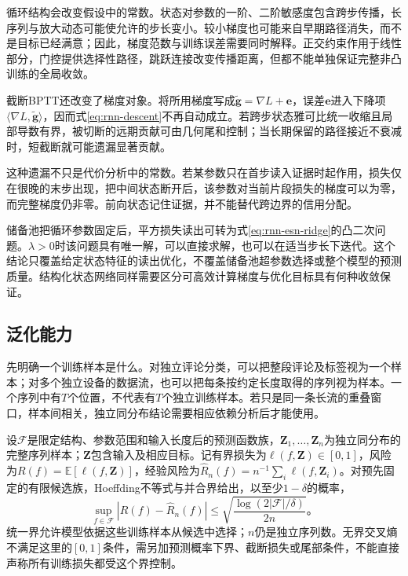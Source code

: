 循环结构会改变假设中的常数。状态对参数的一阶、二阶敏感度包含跨步传播，长序列与放大动态可能使允许的步长变小。较小梯度也可能来自早期路径消失，而不是目标已经满意；因此，梯度范数与训练误差需要同时解释。正交约束作用于线性部分，门控提供选择性路径，跳跃连接改变传播距离，但都不能单独保证完整非凸训练的全局收敛。

截断BPTT还改变了梯度对象。将所用梯度写成$\widetilde{\bm{g}}=\nabla L+\bm{e}$，误差$\bm{e}$进入下降项$\langle\nabla L,\widetilde{\bm{g}}\rangle$，因而式\eqref{eq:rnn-descent}不再自动成立。若跨步状态雅可比统一收缩且局部导数有界，被切断的远期贡献可由几何尾和控制；当长期保留的路径接近不衰减时，短截断就可能遗漏显著贡献。

这种遗漏不只是代价分析中的常数。若某参数只在首步读入证据时起作用，损失仅在很晚的末步出现，把中间状态断开后，该参数对当前片段损失的梯度可以为零，而完整梯度仍非零。前向状态记住证据，并不能替代跨边界的信用分配。

储备池把循环参数固定后，平方损失读出可转为式\eqref{eq:rnn-esn-ridge}的凸二次问题。$\lambda>0$时该问题具有唯一解，可以直接求解，也可以在适当步长下迭代。这个结论只覆盖给定状态特征的读出优化，不覆盖储备池超参数选择或整个模型的预测质量。结构化状态网络同样需要区分可高效计算梯度与优化目标具有何种收敛保证。

\subsection{泛化能力}
\label{sec:rnn-generalization}

先明确一个训练样本是什么。对独立评论分类，可以把整段评论及标签视为一个样本；对多个独立设备的数据流，也可以把每条按约定长度取得的序列视为样本。一个序列中有$T$个位置，不代表有$T$个独立训练样本。若只是同一条长流的重叠窗口，样本间相关，独立同分布结论需要相应依赖分析后才能使用。

设$\mathcal{F}$是限定结构、参数范围和输入长度后的预测函数族，$\bm{Z}_1,\ldots,\bm{Z}_n$为独立同分布的完整序列样本；$\bm{Z}$包含输入及相应目标。记有界损失为$\ell(f,\bm{Z})\in[0,1]$，风险为$R(f)=\mathbb{E}[\ell(f,\bm{Z})]$，经验风险为$\widehat R_n(f)=n^{-1}\sum_i\ell(f,\bm{Z}_i)$。对预先固定的有限候选族，Hoeffding不等式与并合界给出，以至少$1-\delta$的概率，
\begin{equation}
  \sup_{f\in\mathcal{F}}\left|R(f)-\widehat R_n(f)\right|
    \leq\sqrt{\frac{\log(2|\mathcal{F}|/\delta)}{2n}}\text{。}
  \label{eq:rnn-finite-family-bound}
\end{equation}
统一界允许模型依据这些训练样本从候选中选择；$n$仍是独立序列数。无界交叉熵不满足这里的$[0,1]$条件，需另加预测概率下界、截断损失或尾部条件，不能直接声称所有训练损失都受这个界控制。

